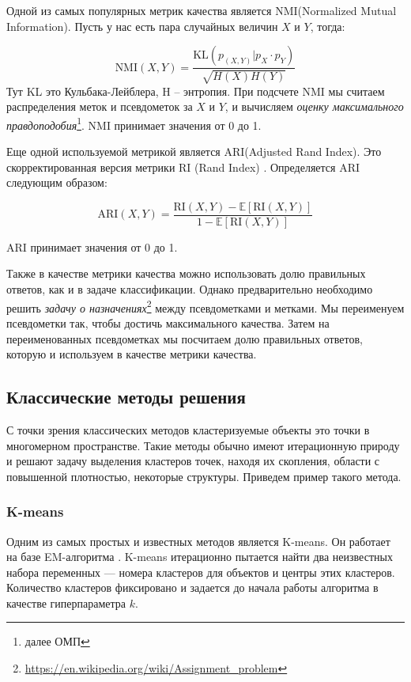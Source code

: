 \documentclass[a4paper,12pt]{extarticle}
\begin{document}
Одной из самых популярных метрик качества является NMI(Normalized Mutual \\
Information).
Пусть у нас есть пара случайных величин $X$ и $Y$, тогда:

\[
	\text{NMI}(X,Y) = \frac{\text{KL}(p_{(X, Y)}| p_X \cdot p_Y)}{\sqrt{H(X)H(Y)}}
\]
Тут KL это Кульбака-Лейблера, H -- энтропия.
При подсчете NMI мы считаем распределения меток и псевдометок 
за $X$ и $Y$, и вычисляем \textit{оценку максимального правдоподобия}\footnote{далее ОМП}. NMI 
принимает значения от 0 до 1.

Еще одной используемой метрикой является ARI(Adjusted Rand Index).
Это скорректированная версия метрики RI (Rand Index) \cite{rand1971objective}.
Определяется ARI следующим образом:

\[
	\text{ARI}(X, Y) = \frac{\text{RI}(X, Y) - \mathds{E}[\text{RI}(X, Y)]}{1 - \mathds{E}[\text{RI}(X, Y)]}
\]

ARI принимает значения от 0 до 1.

Также в качестве метрики качества можно использовать долю 
правильных ответов, как и в задаче классификации. Однако предварительно 
необходимо решить \textit{задачу о назначениях}\footnote{\url{https://en.wikipedia.org/wiki/Assignment_problem}}
между псевдометками и метками.
Мы переименуем псевдометки так, чтобы достичь максимального качества.
Затем на переименованных псевдометках мы посчитаем долю правильных ответов, которую 
и используем в качестве метрики качества.

\subsection{Классические методы решения}

С точки зрения классических методов кластеризуемые
объекты это точки в многомерном пространстве. Такие
методы обычно имеют итерационную природу и решают 
задачу выделения кластеров точек, находя их скопления, 
области с повышенной плотностью, некоторые структуры.
Приведем пример такого метода.

\subsubsection{K-means}

Одним из самых простых и известных методов является
K-means. Он работает на базе EM-алгоритма \cite{dempster1977maximum}.
K-means итерационно пытается найти два неизвестных набора переменных ---
номера кластеров для объектов и центры этих кластеров. 
Количество кластеров фиксировано и задается до начала 
работы алгоритма в качестве гиперпараметра $k$.
\end{document}
